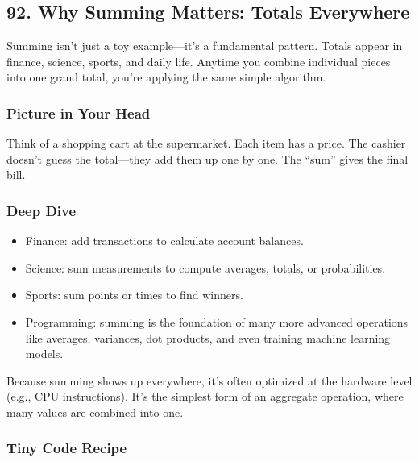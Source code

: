 \documentclass[
  letterpaper,
  DIV=11,
  numbers=noendperiod]{scrreprt}
\providecommand{\tightlist}{%
  \setlength{\itemsep}{0pt}\setlength{\parskip}{0pt}}
\begin{document}
\subsection{92. Why Summing Matters: Totals
Everywhere}\label{why-summing-matters-totals-everywhere}

Summing isn't just a toy example---it's a fundamental pattern. Totals
appear in finance, science, sports, and daily life. Anytime you combine
individual pieces into one grand total, you're applying the same simple
algorithm.

\subsubsection{Picture in Your Head}\label{picture-in-your-head-92}

Think of a shopping cart at the supermarket. Each item has a price. The
cashier doesn't guess the total---they add them up one by one. The
``sum'' gives the final bill.

\subsubsection{Deep Dive}\label{deep-dive-62}

\begin{itemize}
\tightlist
\item
  Finance: add transactions to calculate account balances.
\item
  Science: sum measurements to compute averages, totals, or
  probabilities.
\item
  Sports: sum points or times to find winners.
\item
  Programming: summing is the foundation of many more advanced
  operations like averages, variances, dot products, and even training
  machine learning models.
\end{itemize}

Because summing shows up everywhere, it's often optimized at the
hardware level (e.g., CPU instructions). It's the simplest form of an
aggregate operation, where many values are combined into one.

\subsubsection{Tiny Code Recipe}\label{tiny-code-recipe-90}
\end{document}
